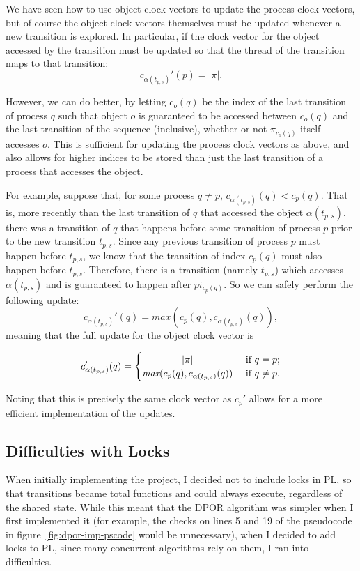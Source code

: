 \documentclass[12pt,a4paper,twoside,openright]{report}
\begin{document}
We have seen how to use object clock vectors to
update the process clock vectors, but of course
the object clock vectors themselves must be
updated whenever a new transition is explored.
In particular, if the clock vector for the
object accessed by the transition must be
updated so that the thread of the transition
maps to that transition:
\[c_{\alpha(t_{p,s})}'(p) = |\pi|.\]

However, we can do better, by letting
$c_o(q)$ be the index of the
last transition of process
$q$ such that object $o$ is guaranteed to be
accessed between $c_o(q)$ and the last
transition of the sequence (inclusive),
whether or not $\pi_{c_o(q)}$ itself
accesses $o$.
This is sufficient for updating the
process clock vectors as above, and
also allows for higher indices to
be stored than just the last
transition of a process that
accesses the object.

For example, suppose that,
for some process $q \neq p$,
$c_{\alpha(t_{p,s})}(q) < c_p(q)$. That is,
more recently than the last transition of
$q$ that accessed the object $\alpha(t_{p,s})$,
there was a transition of $q$ that happens-before
some transition of process $p$ prior to the new
transition $t_{p,s}$. Since any previous
transition of process $p$ must happen-before
$t_{p,s}$, we know that the transition
of index $c_p(q)$ must also happen-before
$t_{p,s}$. Therefore, there is a transition
(namely $t_{p,s}$) which
accesses $\alpha(t_{p,s})$ and is guaranteed
to happen after $pi_{c_p(q)}$. So we can
safely perform the following update:
\[ c_{\alpha(t_{p,s})}'(q) =\textit{max}(c_p(q),
c_{\alpha(t_{p,s})}(q)),
\]
meaning that the full update for the object
clock vector is

\[ c_{\alpha(t_{p,s})}'(q) =
\begin{cases}
\hfill |\pi| \hfill & \text{ if } q = p; \\
\hfill \textit{max}(c_p(q),
c_{\alpha(t_{p,s})}(q))
\hfill & \text{ if } q \neq p.
\end{cases}\]

Noting that this is precisely the same
clock vector as $c_p'$ allows for a
more efficient implementation of
the updates.

\subsection{Difficulties with Locks}

When initially implementing the project,
I decided not to include locks in PL,
so that transitions became total functions
and could always execute, regardless
of the shared state. While this meant
that the DPOR algorithm was simpler when
I first implemented it (for example,
the checks on lines 5 and 19 of the
pseudocode in figure~\ref{fig:dpor-imp-pscode}
would be unnecessary), when I decided
to add locks to PL, since many
concurrent algorithms rely on them,
I ran into difficulties.
\end{document}
